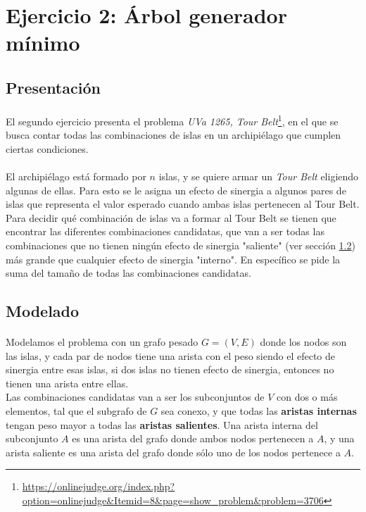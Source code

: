 \documentclass[../main.tex]{subfiles}
\begin{document}
\section{Ejercicio 2: Árbol generador mínimo}
\label{sec:ej2-intro}

\subsection{Presentación}
\paragraph{} El segundo ejercicio presenta el problema \textit{UVa 1265, Tour Belt}\footnote{\url{https://onlinejudge.org/index.php?option=onlinejudge&Itemid=8&page=show_problem&problem=3706}}, en el que se busca contar todas las combinaciones de islas en un archipiélago que cumplen ciertas condiciones. %

\paragraph{} El archipiélago está formado por \(n\) islas, y se quiere armar un \textit{Tour Belt} eligiendo algunas de ellas. Para esto se le asigna un efecto de sinergia a algunos pares de islas que representa el valor esperado cuando ambas islas pertenecen al Tour Belt. \\ %
Para decidir qué combinación de islas va a formar al Tour Belt se tienen que encontrar las diferentes combinaciones candidatas, que van a ser todas las combinaciones que no tienen ningún efecto de sinergia "saliente" (ver sección \ref{sec:ej2-model}) más grande que cualquier efecto de sinergia "interno". En específico se pide la suma del tamaño de todas las combinaciones candidatas. %

\subsection{Modelado}
\label{sec:ej2-model}
\paragraph{} Modelamos el problema con un grafo pesado \(G = (V, E)\) donde los nodos son las islas, y cada par de nodos tiene una arista con el peso siendo el efecto de sinergia entre esas islas, si dos islas no tienen efecto de sinergia, entonces no tienen una arista entre ellas. \\
Las combinaciones candidatas van a ser los subconjuntos de \(V\) con dos o más elementos, tal que el subgrafo de \(G\) sea conexo, y que todas las \textbf{aristas internas} tengan peso mayor a todas las \textbf{aristas salientes}. Una arista interna del subconjunto \(A\) es una arista del grafo donde ambos nodos pertenecen a \(A\), y una arista saliente es una arista del grafo donde sólo uno de los nodos pertenece a \(A\). %
\end{document}
